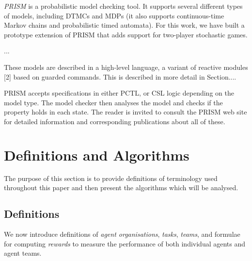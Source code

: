 \documentclass{llncs}
\begin{document}
\emph{PRISM} \cite{KNP11} is a probabilistic model checking tool.
It supports several different types of models, including DTMCs and MDPs
(it also supports continuous-time Markov chains and probabilistic timed automata).
For this work, we have built a prototype extension of PRISM that adds support for two-player stochastic games.

...

These models are
described in a high-level language, a variant of reactive modules [2] based on guarded
commands. This is described in more detail in Section....

PRISM accepts specifications in either PCTL, or CSL logic depending on the model
type. The model checker then analyses the model and checks if the property holds in each
state.
The reader is invited to consult the PRISM
web site \cite{} for detailed information and corresponding
publications about all of these.

\iffalse
The basic components of the language are modules and variables. A
system is constructed as a number of modules which can interact with each other.
A module contains a number of variables which express the state of the module,
and its behavior is given by a set of guarded commands of the form:

[] $\langle$guard$>$ \! $\langle$command$>$;

The guard is a predicate over the variables of the system and the command describes
a transition which the module can make if the guard is true (using primed variables
to denote the next values of variables). If a transition is probabilistic, then the
command is specified as:

$\langle prob \rangle$ : $\langle$ command $\rangle$ + ...+ $\langle$ prob$\rangle$ : <command>

\fi


\section{Definitions and Algorithms}

The purpose of this section is to provide definitions of terminology
used throughout this paper and then present the algorithms which will be analysed.

\subsection{Definitions}

We now introduce definitions of \emph{agent organisations}, \emph{tasks}, \emph{teams}, and formulae for computing \emph{rewards} to measure the performance of both individual agents and agent teams.
\end{document}
